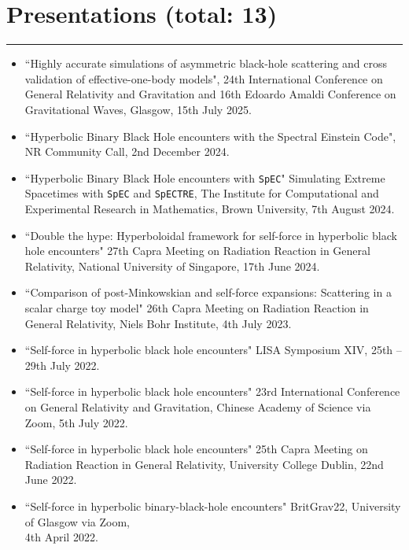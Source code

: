 \documentclass[10.5pt, oneside]{article}   	%
\begin{document}
 \newpage
 {\color{Sectioncolour}
\section*{Presentations {\rm (total: 13)}}
\vspace{-3mm}
\noindent\rule{\linewidth}{0.6pt}}
\begin{itemize}
\item ``Highly accurate simulations of asymmetric black-hole scattering and cross validation of effective-one-body models", 24th International Conference on General Relativity and Gravitation and 16th Edoardo Amaldi Conference on Gravitational Waves, Glasgow, 15th July 2025.
\item ``Hyperbolic Binary Black Hole encounters with the Spectral Einstein Code", NR Community Call, 2nd December 2024.
\item ``Hyperbolic Binary Black Hole encounters with \texttt{SpEC}" Simulating Extreme Spacetimes with \texttt{SpEC} and \texttt{SpECTRE}, The Institute for Computational and Experimental Research in Mathematics, Brown University, 7th August 2024.
\item ``Double the hype: Hyperboloidal framework for self-force in hyperbolic black hole encounters" 27th Capra Meeting on Radiation Reaction in General Relativity, National University of Singapore, 17th June 2024.
\item ``Comparison of post-Minkowskian and self-force expansions: Scattering in a scalar charge toy model" 26th Capra Meeting on Radiation Reaction in General Relativity, Niels Bohr Institute, 4th July 2023.
\item ``Self-force in hyperbolic black hole encounters" LISA Symposium XIV, 25th -- 29th July 2022. \href{https://www.youtube.com/watch?v=p2-RgYB6Jhk}{}
\item ``Self-force in hyperbolic black hole encounters" 23rd International Conference on General Relativity and Gravitation, Chinese Academy of Science via Zoom, 5th July 2022. \href{https://www.koushare.com/video/videodetail/30159}{}
\item ``Self-force in hyperbolic black hole encounters" 25th Capra Meeting on Radiation Reaction in General Relativity, University College Dublin, 22nd June 2022. \href{https://oliverlong.info/talks/capra25}{}
\item ``Self-force in hyperbolic binary-black-hole encounters" BritGrav22, University of Glasgow via Zoom, \\ 4th April 2022. \href{https://www.youtube.com/watch?v=zZEblkjb5IM}{}

\end{itemize}
\end{document}
